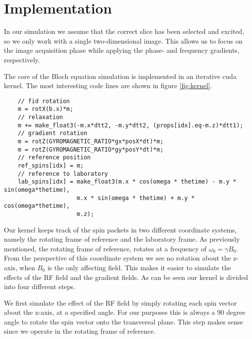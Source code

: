 \section{Implementation}



In our simulation we assume that the correct slice has been selected
and excited, so we only work with a single two-dimensional image. This
allows us to focus on the image acquisition phase while applying the
phase- and frequency gradients, respectively.

The core of the Bloch equation simulation is implemented in an
iterative cuda kernel. The most interesting code lines are shown in
figure \ref{fig:kernel}.

\begin{figure*}
  \centering
\begin{lstlisting}
    // fid rotation
    m = rotX(b.x)*m;
    // relaxation
    m += make_float3(-m.x*dtt2, -m.y*dtt2, (props[idx].eq-m.z)*dtt1);
    // gradient rotation
    m = rotZ(GYROMAGNETIC_RATIO*gx*posX*dt)*m;
    m = rotZ(GYROMAGNETIC_RATIO*gy*posY*dt)*m;
    // reference position
    ref_spins[idx] = m;
    // reference to laboratory
    lab_spins[idx] = make_float3(m.x * cos(omega * thetime) - m.y * sin(omega*thetime), 
                     m.x * sin(omega * thetime) + m.y * cos(omega*thetime),  
                     m.z);
\end{lstlisting}
  \caption{A code snippet of the simulation kernel.}
  \label{fig:kernel}
\end{figure*}

Our kernel keeps track of the spin packets in two different coordinate
systems, namely the rotating frame of reference and the laboratory
frame. As previously mentioned, the rotating frame of reference,
rotates at a frequency of $\omega_0=\gamma B_0$. From the perspective
of this coordinate system we see no rotation about the z-axis, when
$B_0$ is the only affecting field. This makes it easier to simulate
the effects of the RF field and the gradient fields. As can be seen our
kernel is divided into four different steps. 

We first simulate the effect of the RF field by simply rotating each
spin vector about the x-axis, at a specified angle. For our purposes
this is always a 90 degree angle to rotate the spin vector onto the
transversal plane. This step makes sense since we operate in the
rotating frame of reference.

